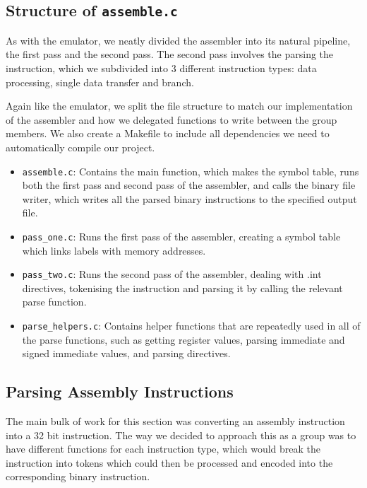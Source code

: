\documentclass[11pt]{article}
\begin{document}
\subsection{Structure of \texttt{assemble.c}}

As with the emulator, we neatly divided the assembler into its natural pipeline, the first pass and the second pass. The second pass involves the parsing the instruction, which we subdivided into 3 different instruction types: data processing, single data transfer and branch.

Again like the emulator, we split the file structure to match our implementation of the assembler and how we delegated functions to write between the group members. We also create a Makefile to include all dependencies we need to automatically compile our project.

\begin{itemize}

\item \texttt{assemble.c}: Contains the main function, which makes the symbol table, runs both the first pass and second pass of the assembler, and calls the binary file writer, which writes all the parsed binary instructions to the specified output file.
\item \texttt{pass\_one.c}: Runs the first pass of the assembler, creating a symbol table which links labels with memory addresses.
\item \texttt{pass\_two.c}: Runs the second pass of the assembler, dealing with .int directives, tokenising the instruction and parsing it by calling the relevant parse function.
\item \texttt{parse\_helpers.c}: Contains helper functions that are repeatedly used in all of the parse functions, such as getting register values, parsing immediate and signed immediate values, and parsing directives.

\end{itemize}


\subsection{Parsing Assembly Instructions}
The main bulk of work for this section was converting an assembly instruction into a 32 bit instruction. The way we decided to approach this as a group was to have different functions for each instruction type, which would break the instruction into tokens which could then be processed and encoded into the corresponding binary instruction.
\end{document}
